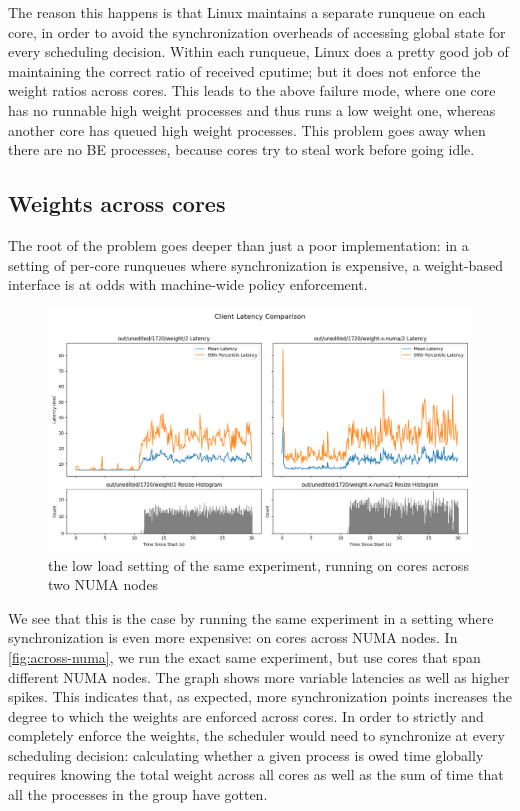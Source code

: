 The reason this happens is that Linux maintains a separate runqueue on each
core, in order to avoid the synchronization overheads of accessing global state
for every scheduling decision. Within each runqueue, Linux does a pretty good
job of maintaining the correct ratio of received cputime; but it does not
enforce the weight ratios across cores. This leads to the above failure mode,
where one core has no runnable high weight processes and thus runs a low weight
one, whereas another core has queued high weight processes. This problem goes
away when there are no BE processes, because cores try to steal work before
going idle.

\subsection{Weights across cores}

The root of the problem goes deeper than just a poor implementation: in a
setting of per-core runqueues where synchronization is expensive, a weight-based
interface is at odds with machine-wide policy enforcement.

\begin{figure}[t]
    \centering
    \includegraphics[width=\columnwidth]{graphs/cmp-x-numa.png}
    \caption{the low load setting of the same experiment, running on cores
    across two NUMA nodes}\label{fig:across-numa}
\end{figure}

We see that this is the case by running the same experiment in a setting where
synchronization is even more expensive: on cores across NUMA nodes. In
\autoref{fig:across-numa}, we run the exact same experiment, but use cores that
span different NUMA nodes. The graph shows more variable latencies as well as
higher spikes. This indicates that, as expected, more synchronization points
increases the degree to which the weights are enforced across cores. In order to
strictly and completely enforce the weights, the scheduler would need to
synchronize at every scheduling decision: calculating whether a given process is
owed time globally requires knowing the total weight across all cores as well as
the sum of time that all the processes in the group have gotten. 


